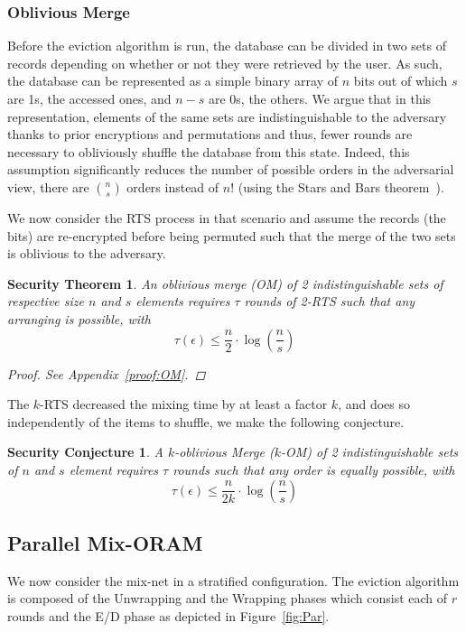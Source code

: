 \documentclass{llncs}
\newtheorem{secthm}{Security Theorem}
\newtheorem{seccjt}{Security Conjecture}
\begin{document}
\subsubsection{Oblivious Merge}\label{OM}
Before the eviction algorithm is run, the database can be divided in two sets of records depending on whether or not they were retrieved by the user. As such, the database can be represented as a simple binary array of $n$ bits out of which $s$ are 1s, the accessed ones, and $n-s$ are 0s, the others.
We argue that in this representation, elements of the same sets are indistinguishable to the adversary thanks to prior encryptions and permutations and thus, fewer rounds are necessary to obliviously shuffle the database from this state. Indeed, this assumption significantly reduces the number of possible orders in the adversarial view, there are  ${n \choose s}$ orders instead of $n!$ (using the Stars and Bars theorem~\cite{feller1950probability}).

We now consider the RTS process in that scenario and assume the records (the bits) are re-encrypted before being permuted such that the merge of the two sets is oblivious to the adversary.

\begin{secthm}
An oblivious merge (OM) of 2 indistinguishable sets of respective size $n$ and $s$ elements requires $\tau$ rounds of 2-RTS such that any arranging is possible, with
$$\tau(\epsilon) \leq \frac{n}{2}  \cdot \log \left (\frac{n}{s}\right)$$%
\begin{proof}
See Appendix~\ref{proof:OM}.
\end{proof}
\end{secthm}

The $k$-RTS decreased the mixing time by at least a factor $k$, and does so independently of the items to shuffle, we make the following conjecture.

\begin{seccjt}\label{sec:kOM}
A $k$-oblivious Merge ($k$-OM) of 2 indistinguishable sets of $n$ and $s$ element requires $\tau$ rounds such that any order is equally possible, with
$$ \tau(\epsilon) \leq \frac{n}{2k}  \cdot \log \left (\frac{n}{s}\right) $$
\end{seccjt}
%
\subsection{Parallel Mix-ORAM}\label{parallelMixORAM}
%
We now consider the mix-net in a stratified configuration. The eviction algorithm is composed of the Unwrapping  and the Wrapping phases which consist each of $r$ rounds and the E/D phase as depicted in Figure~\ref{fig:Par}.
\end{document}
